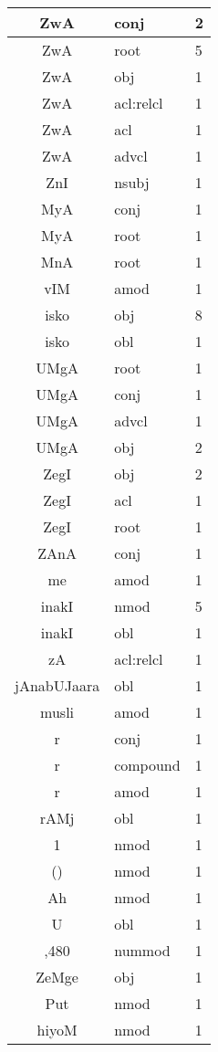 \documentclass[a4 paper]{article}
\begin{document}
\begin{longtable}{cp{}p{}}
ZwA & conj & 2\\ \midrule ZwA & root & 5\\ \midrule ZwA & obj & 1\\ \midrule ZwA & acl:relcl & 1\\ \midrule ZwA & acl & 1\\ \midrule ZwA & advcl & 1\\ \midrule 
ZnI & nsubj & 1\\ \midrule 
MyA & conj & 1\\ \midrule MyA & root & 1\\ \midrule 
MnA & root & 1\\ \midrule 
vIM & amod & 1\\ \midrule 
isko & obj & 8\\ \midrule isko & obl & 1\\ \midrule 
UMgA & root & 1\\ \midrule UMgA & conj & 1\\ \midrule UMgA & advcl & 1\\ \midrule UMgA & obj & 2\\ \midrule 
ZegI & obj & 2\\ \midrule ZegI & acl & 1\\ \midrule ZegI & root & 1\\ \midrule 
ZAnA & conj & 1\\ \midrule 
me & amod & 1\\ \midrule 
inakI & nmod & 5\\ \midrule inakI & obl & 1\\ \midrule 
zA & acl:relcl & 1\\ \midrule 
jAnabUJaara & obl & 1\\ \midrule 
musli & amod & 1\\ \midrule 
r & conj & 1\\ \midrule r & compound & 1\\ \midrule r & amod & 1\\ \midrule 
rAMj & obl & 1\\ \midrule 
1 & nmod & 1\\ \midrule 
() & nmod & 1\\ \midrule 
Ah & nmod & 1\\ \midrule 
U & obl & 1\\ \midrule 
,480 & nummod & 1\\ \midrule 
ZeMge & obj & 1\\ \midrule 
Put & nmod & 1\\ \midrule 
hiyoM & nmod & 1\\ \midrule 

\end{longtable}
\end{document}
